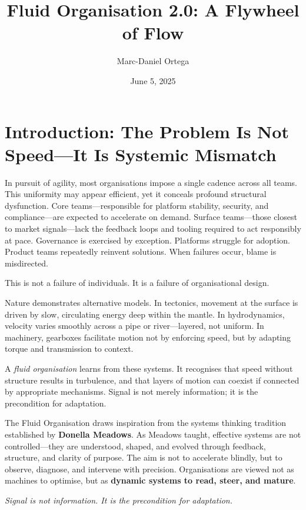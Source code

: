 \documentclass[12pt]{article}
\title{Fluid Organisation 2.0: A Flywheel of Flow}
\author{Marc-Daniel Ortega}
\date{June 5, 2025}
\newenvironment{pullquote}
  {\begin{quoting}[leftmargin=2em,rightmargin=2em]\itshape}
  {\end{quoting}}
\begin{document}
\maketitle
\tableofcontents
\newpage


\section{Introduction: The Problem Is Not Speed—It Is Systemic Mismatch}

In pursuit of agility, most organisations impose a single cadence across all teams. This uniformity may appear efficient, yet it conceals profound structural dysfunction. Core teams—responsible for platform stability, security, and compliance—are expected to accelerate on demand. Surface teams—those closest to market signals—lack the feedback loops and tooling required to act responsibly at pace. Governance is exercised by exception. Platforms struggle for adoption. Product teams repeatedly reinvent solutions. When failures occur, blame is misdirected.

This is not a failure of individuals. It is a failure of organisational design.

Nature demonstrates alternative models. In tectonics, movement at the surface is driven by slow, circulating energy deep within the mantle. In hydrodynamics, velocity varies smoothly across a pipe or river—layered, not uniform. In machinery, gearboxes facilitate motion not by enforcing speed, but by adapting torque and transmission to context.

A \textit{fluid organisation} learns from these systems. It recognises that speed without structure results in turbulence, and that layers of motion can coexist if connected by appropriate mechanisms. Signal is not merely information; it is the precondition for adaptation.

The Fluid Organisation draws inspiration from the systems thinking tradition established by \textbf{Donella Meadows}. As Meadows taught, effective systems are not controlled—they are understood, shaped, and evolved through feedback, structure, and clarity of purpose. The aim is not to accelerate blindly, but to observe, diagnose, and intervene with precision. Organisations are viewed not as machines to optimise, but as \textbf{dynamic systems to read, steer, and mature}.

\begin{pullquote}
Signal is not information. It is the precondition for adaptation.
\end{pullquote}
\end{document}
